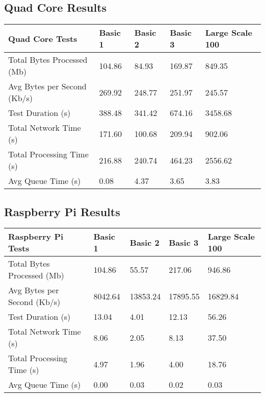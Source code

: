 \newpage
\subsection{Quad Core Results}

\begin{table}[!ht]
    \centering
    \begin{tabular}{|l|l|l|l|l|}
    \hline
        Quad Core Tests & Basic 1 & Basic 2 & Basic 3 & Large Scale 100 \\ \hline
        Total Bytes Processed (Mb) & 104.86 & 84.93 & 169.87 & 849.35 \\ \hline
        Avg Bytes per Second (Kb/s) & 269.92 & 248.77 & 251.97 & 245.57 \\ \hline
        Test Duration (s) & 388.48 & 341.42 & 674.16 & 3458.68 \\ \hline
        Total Network Time (s) & 171.60 & 100.68 & 209.94 & 902.06 \\ \hline
        Total Processing Time (s) & 216.88 & 240.74 & 464.23 & 2556.62 \\ \hline
        Avg Queue Time (s) & 0.08 & 4.37 & 3.65 & 3.83 \\ \hline
    \end{tabular}
\end{table}

\newpage
\subsection{Raspberry Pi Results}
\begin{table}[!ht]
    \centering
    \begin{tabular}{|l|l|l|l|l|}
    \hline
        Raspberry Pi Tests & Basic 1 & Basic 2 & Basic 3 & Large Scale 100 \\ \hline
        Total Bytes Processed (Mb) & 104.86 & 55.57 & 217.06 & 946.86 \\ \hline
        Avg Bytes per Second (Kb/s) & 8042.64 & 13853.24 & 17895.55 & 16829.84 \\ \hline
        Test Duration (s) & 13.04 & 4.01 & 12.13 & 56.26 \\ \hline
        Total Network Time (s) & 8.06 & 2.05 & 8.13 & 37.50 \\ \hline
        Total Processing Time (s) & 4.97 & 1.96 & 4.00 & 18.76 \\ \hline
        Avg Queue Time (s) & 0.00 & 0.03 & 0.02 & 0.03 \\ \hline
    \end{tabular}
\end{table}

